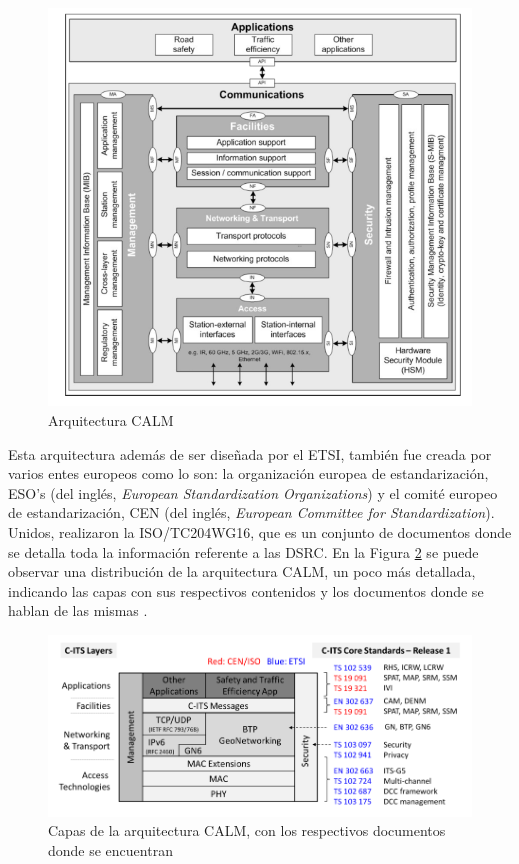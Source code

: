 \begin{figure}[!h]
	\centering
		\includegraphics[scale=0.9]{Imagenes/calm}
		\caption{Arquitectura CALM \cite{anaya2016sistema}}
		\label{fig:calm}
	\end{figure}	

\par Esta arquitectura además de ser diseñada por el ETSI, también fue creada por varios entes europeos como lo son: la organización europea de estandarización, ESO's (del inglés, \textit{European Standardization Organizations}) y el comité europeo de estandarización, CEN (del inglés, \textit{European Committee for Standardization}). Unidos, realizaron la ISO/TC204WG16, que es un conjunto de documentos donde se detalla toda la información referente a las DSRC. En la Figura \ref{fig:layers} se puede observar una distribución de la arquitectura CALM, un poco más detallada, indicando las capas con sus respectivos contenidos y los documentos donde se hablan de las mismas \cite{festag2014cooperative}.\\

\begin{figure}[!h]
	\centering
		\includegraphics[scale=0.7]{Imagenes/layers}
		\caption{Capas de la arquitectura CALM, con los respectivos documentos donde se encuentran \cite{festag2014cooperative}}
		\label{fig:layers}
	\end{figure}	


